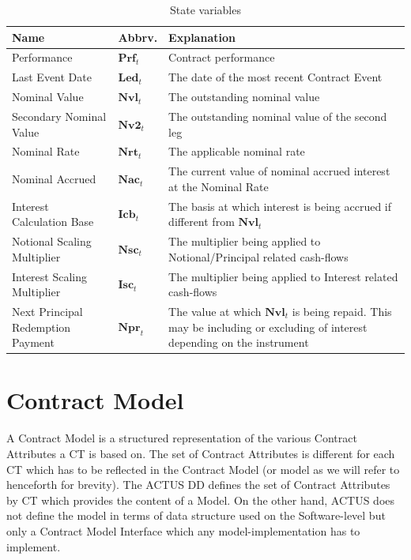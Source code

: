 \documentclass[9pt,oneside]{amsart}
\newcommand{\svar}[2]{\textbf{#1}_{#2}}
\begin{document}
\begin{multicols}{2}
\begin{table}[H]
	\centering
	\begin{tabular}{| p{0.8in}p{0.4in}p{1.6in} |}
	\hline
	\textbf{Name} & \textbf{Abbrv.} & \textbf{Explanation} \\
	\hline
	Performance & $\svar{Prf}{t}$ & Contract performance \\	
	\hline
	Last Event Date & $\svar{Led}{t}$ & The date of the most recent Contract Event \\
	\hline
	Nominal Value & $\svar{Nvl}{t}$ & The outstanding nominal value \\
	\hline
	Secondary Nominal Value & $\svar{Nv2}{t}$ & The outstanding nominal value of the second leg \\
	\hline
	Nominal Rate & $\svar{Nrt}{t}$ & The applicable nominal rate \\
	\hline
	Nominal Accrued & $\svar{Nac}{t}$ & The current value of nominal accrued interest at the Nominal Rate \\
	\hline
	Interest Calculation Base & $\svar{Icb}{t}$ & The basis at which interest is being accrued if different from $\svar{Nvl}{t}$ \\
	\hline
	Notional Scaling Multiplier & $\svar{Nsc}{t}$ & The multiplier being applied to Notional/Principal related
	cash-flows \\
	\hline
	Interest Scaling Multiplier & $\svar{Isc}{t}$ & The multiplier being applied to Interest related cash-flows \\
	\hline
	Next Principal Redemption Payment & $\svar{Npr}{t}$ & The value at which $\svar{Nvl}{t}$ is being repaid. This may be including or excluding of interest depending on the instrument\\
	\hline
	\end{tabular}
	\caption{State variables}
	\label{tbl:statevars}
\end{table}





\section{Contract Model}\label{sec:model}

A Contract Model is a structured representation of the various Contract Attributes a CT is based on. The set of Contract Attributes is different for each CT which has to be reflected in the Contract Model (or model as we will refer to henceforth for brevity). The ACTUS DD defines the set of Contract Attributes by CT which provides the content of a Model. On the other hand, ACTUS does not define the model in terms of data structure used on the Software-level but only a Contract Model Interface which any model-implementation has to implement.



\end{multicols}
\end{document}
